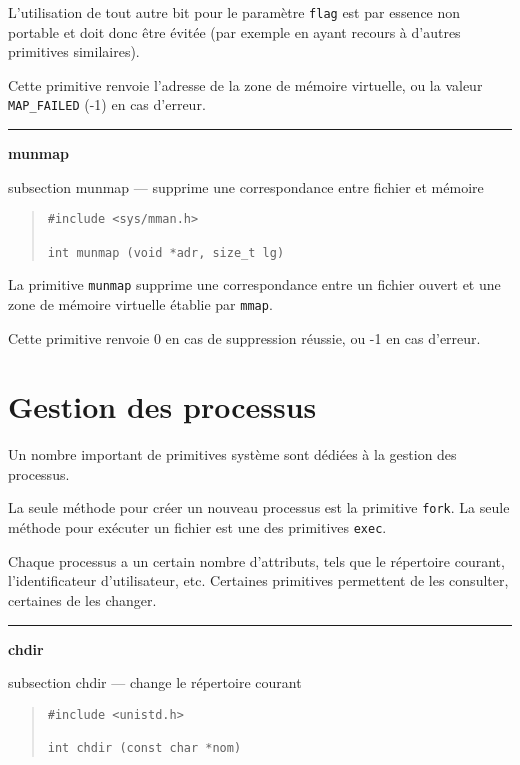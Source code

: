 \documentclass [twoside] {report}
\newcommand {\primitive} [1]
    {
	{\large \bf #1}
	\addcontentsline {toc} {subsection} {#1}
    }
\newcommand {\separation}
    {
	\vspace {7mm}
	\nopagebreak
	\hrule
    }
\begin{document}
L'utilisation de tout autre bit pour le paramètre \texttt {flag} est
par essence non portable et doit donc être évitée (par exemple en
ayant recours à d'autres primitives similaires).

Cette primitive renvoie l'adresse de la zone de mémoire virtuelle, ou
la valeur \texttt {MAP\_FAILED} (-1) en cas d'erreur.


\separation
\primitive {munmap} --- supprime une correspondance entre fichier et mémoire

\begin {quote}
\begin {verbatim}
#include <sys/mman.h>

int munmap (void *adr, size_t lg)
\end{verbatim}
\end {quote}

La primitive {\tt munmap} supprime une correspondance entre un fichier
ouvert et une zone de mémoire virtuelle établie par \texttt {mmap}.

Cette primitive renvoie 0 en cas de suppression réussie, ou -1 en
cas d'erreur.



\section {Gestion des processus}


Un nombre important de primitives système sont
dédiées à la gestion des processus.

La seule méthode pour créer un nouveau processus
est la primitive {\tt fork}. La seule méthode pour
exécuter un fichier est une des primitives
{\tt exec}.

Chaque processus a un certain nombre
d'attributs, tels que le répertoire courant,
l'identificateur d'utilisateur, etc. Certaines
primitives permettent de les consulter, certaines
de les changer.


\separation
\primitive {chdir} --- change le répertoire courant

\begin {quote}
\begin {verbatim}
#include <unistd.h>

int chdir (const char *nom)
\end{verbatim}
\end {quote}
\end{document}
